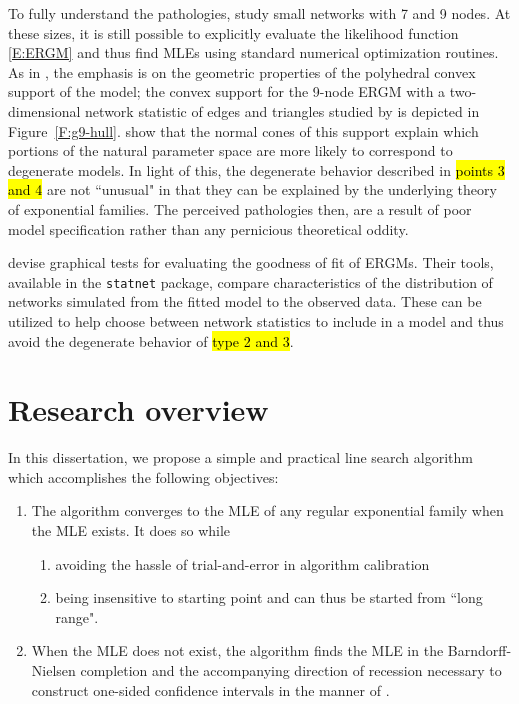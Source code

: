 To fully understand the pathologies, \citeauthor{Handcock:degeneracy,Rinaldo:2009}
study small networks with 7 and 9 nodes.  At these sizes, it is still 
possible to explicitly evaluate the likelihood function \eqref{E:ERGM} and thus 
find MLEs using standard numerical optimization routines.  
As in \citep{Geyer:gdor}, the emphasis is on the geometric properties of the 
polyhedral convex support of the model;
the convex support for the 9-node ERGM with a two-dimensional network statistic of
edges and triangles
studied by \citeauthor{Rinaldo:2009} is depicted in Figure~\ref{F:g9-hull}.
\citeauthor{Rinaldo:2009} show that the normal cones of this support 
explain which portions of the natural parameter space are more likely to correspond to 
degenerate models.  In light of this, the degenerate behavior described in 
\hl{points 3 and 4} are not ``unusual" in that they can be explained by the underlying
theory of exponential families.  The perceived pathologies then, are a result of 
poor model specification rather than any pernicious theoretical oddity.

\citet*{GOF} devise graphical tests for evaluating the goodness of fit of ERGMs.
Their tools, available in the \texttt{statnet} package, compare characteristics of 
the distribution of networks simulated from the fitted model to the observed data.
These can be utilized to help choose between network statistics to include in a 
model and thus avoid the degenerate behavior of \hl{type 2 and 3}. 

%

\section{Research overview} \label{S:Research overview}
In this dissertation, we propose a simple and practical line search algorithm which
accomplishes the following objectives:
\begin{enumerate}
\item The algorithm converges to the MLE of any regular exponential family 
when the MLE exists.  It does so while
\begin{enumerate}
	\item avoiding the hassle of trial-and-error in algorithm calibration
	\item being insensitive to starting point and can thus be started from ``long range".
\end{enumerate}
\item When the MLE does not exist, the algorithm finds the MLE in the Barndorff-Nielsen completion and the 
accompanying direction of recession necessary to construct one-sided 
confidence intervals in the manner of \citet{Geyer:gdor}.
\end{enumerate}


